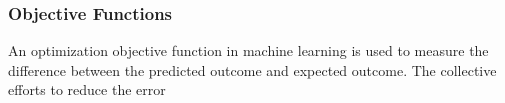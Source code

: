 \subsubsection{Objective Functions}
An optimization objective function in machine learning is used to measure the difference between the predicted outcome and expected outcome. The collective efforts to reduce the error 